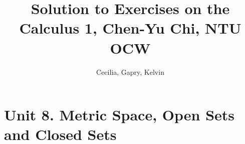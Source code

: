 \documentclass{article}
\title{Solution to Exercises on the \\
Calculus 1, Chen-Yu Chi, NTU OCW}
\author{Cecilia, Gapry, Kelvin}
\begin{document}
\maketitle

\section*{Unit 8. Metric Space, Open Sets and Closed Sets}



\end{document}

